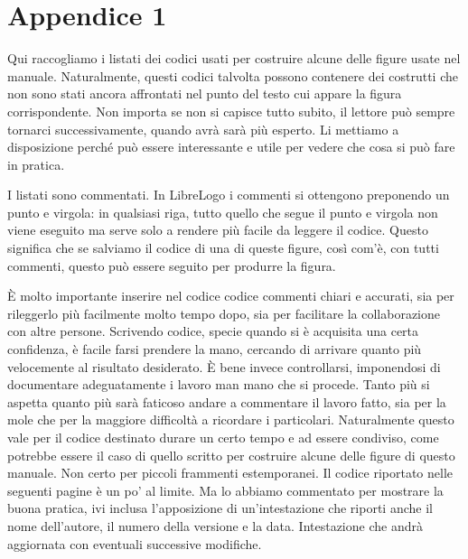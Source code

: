 \chapter{Appendice 1} \label{cap:appendice-1}

Qui raccogliamo i listati dei codici usati per costruire alcune delle figure usate nel manuale. Naturalmente, questi codici talvolta possono contenere dei costrutti che non sono stati ancora affrontati nel punto del testo cui appare la figura corrispondente. Non importa se non si capisce tutto subito, il lettore può sempre tornarci successivamente, quando avrà sarà più esperto. Li mettiamo a disposizione perché può essere interessante e utile per vedere che cosa si può fare in pratica.

I listati sono commentati. In LibreLogo i commenti si ottengono preponendo un punto e virgola: in qualsiasi riga, tutto quello che segue il punto e virgola non viene eseguito ma serve solo a rendere più facile da leggere il codice. Questo significa che se salviamo il codice di una di queste figure, così com'è, con tutti commenti, questo può essere seguito per produrre la figura. 

È molto importante inserire nel codice codice commenti chiari e accurati, sia per rileggerlo più facilmente molto tempo dopo, sia per facilitare la collaborazione con altre persone. Scrivendo codice, specie quando si è acquisita una certa confidenza, è facile farsi prendere la mano, cercando di arrivare quanto più velocemente al risultato desiderato. È bene invece controllarsi, imponendosi di documentare adeguatamente i lavoro man mano che si procede. Tanto più si aspetta quanto più sarà faticoso andare a commentare il lavoro fatto, sia per la mole che per la maggiore difficoltà a ricordare i particolari. Naturalmente questo vale per il codice destinato durare un certo tempo e ad essere condiviso, come potrebbe essere il caso di quello scritto per costruire alcune delle figure di questo manuale. Non certo per piccoli frammenti estemporanei. Il codice riportato nelle seguenti pagine è un po' al limite. Ma lo abbiamo commentato per mostrare la buona pratica, ivi inclusa l'apposizione di un'intestazione che riporti anche il nome dell'autore, il numero della versione e la data. Intestazione che andrà aggiornata con eventuali successive modifiche.


\vskip 1cm

